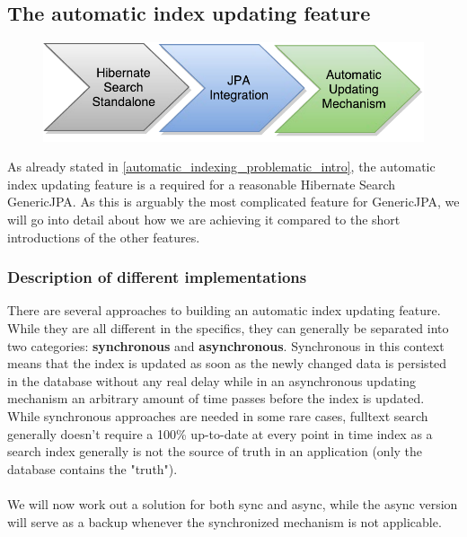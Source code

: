 \subsection{The automatic index updating feature}

\begin{figure}[ht]
	\centering
	\includegraphics[scale=0.75]{images/timeline_genericjpa_complete.pdf}
	\label{project_timeline_third}
\end{figure}
\noindent
As already stated in \ref{automatic_indexing_problematic_intro}, the automatic index updating feature is a required for a reasonable Hibernate Search GenericJPA. As this is arguably the most complicated feature for GenericJPA, we will go into detail about how we are achieving it compared to the short introductions of the other features.

\subsubsection{Description of different implementations} \label{description_of_different_implementations}

There are several approaches to building an automatic index updating feature. While they are all different in the specifics, they can generally be separated into two categories: \textbf{synchronous} and \textbf{asynchronous}. Synchronous in this context means that the index is updated as soon as the newly changed data is persisted in the database without any real delay while in an asynchronous updating mechanism an arbitrary amount of time passes before the index is updated. While synchronous approaches are needed in some rare cases, fulltext search generally doesn't require a 100\% up-to-date at every point in time index as a search index generally is not the source of truth in an application (only the database contains the "truth").
\\\\
We will now work out a solution for both sync and async, while the async version will serve as a backup whenever the synchronized mechanism is not applicable.

